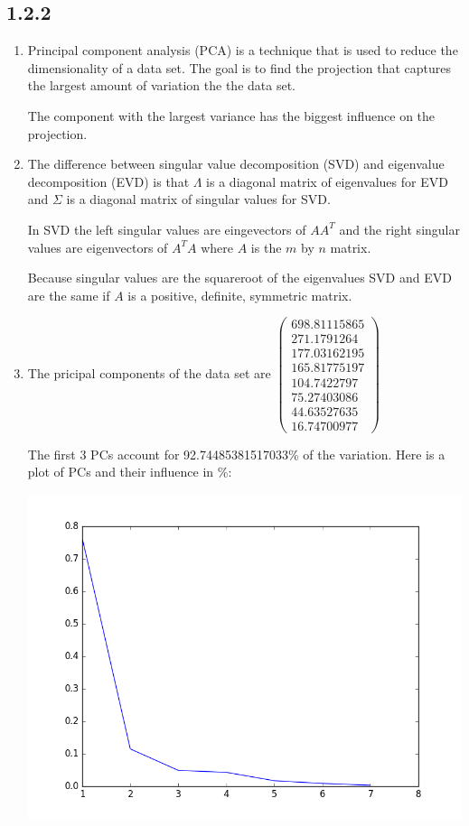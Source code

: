 \documentclass[12pt]{article}
\begin{document}
\subsection*{1.2.2}
\begin{enumerate}[a]
	\item %
	Principal component analysis (PCA) is a technique that is used to reduce the dimensionality of a data set. The goal is to find the projection that captures the largest amount of variation the the data set.

	The component with the largest variance has the biggest influence on the projection.

	\item %
	The difference between singular value decomposition (SVD) and eigenvalue decomposition (EVD) is that $\Lambda$ is a diagonal matrix of eigenvalues for EVD and $\Sigma$ is a diagonal matrix of singular values for SVD.

	In SVD the left singular values are eingevectors of $AA^T$ and the right singular values are eigenvectors of $A^TA$ where $A$ is the $m$ by $n$ matrix.

	Because singular values are the squareroot of the eigenvalues SVD and EVD are the same if $A$ is a positive, definite, symmetric matrix.

	\item %
	The pricipal components of the data set are
	$\begin{pmatrix}
		698.81115865\\ 271.1791264\\ 177.03162195\\ 165.81775197\\ 104.7422797\\ 75.27403086\\ 44.63527635\\ 16.74700977
	\end{pmatrix}$

	The first 3 PCs account for 92.74485381517033\% of the variation. Here is a plot of PCs and their influence in \%:

	\includegraphics[width=\textwidth]{plot_1_2_2-c}


\end{enumerate}
\end{document}
